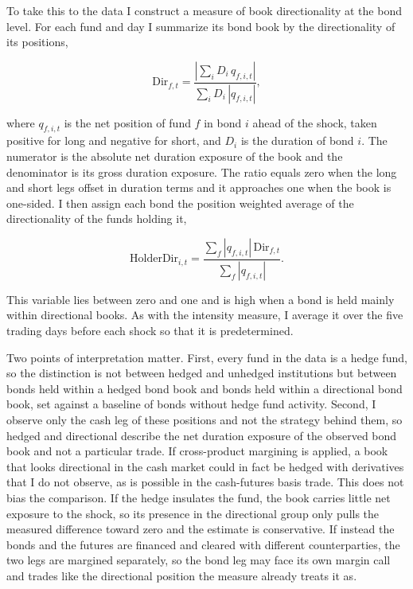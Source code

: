 \documentclass[english, 11pt, oneside]{article}
\begin{document}
To take this to the data I construct a measure of book directionality at the bond level. For each fund and day I summarize its bond book by the directionality of its positions,

\begin{equation}
\text{Dir}_{f,t} = \frac{\left| \sum_{i} D_{i}\, q_{f,i,t} \right|}{\sum_{i} D_{i}\, \left| q_{f,i,t} \right|} ,
\end{equation}

\noindent where $q_{f,i,t}$ is the net position of fund $f$ in bond $i$ ahead of the shock, taken positive for long and negative for short, and $D_{i}$ is the duration of bond $i$. The numerator is the absolute net duration exposure of the book and the denominator is its gross duration exposure. The ratio equals zero when the long and short legs offset in duration terms and it approaches one when the book is one-sided. I then assign each bond the position weighted average of the directionality of the funds holding it,

\begin{equation}
\text{HolderDir}_{i,t} = \frac{\sum_{f} \left| q_{f,i,t} \right|\, \text{Dir}_{f,t}}{\sum_{f} \left| q_{f,i,t} \right|} .
\end{equation}

\noindent This variable lies between zero and one and is high when a bond is held mainly within directional books. As with the intensity measure, I average it over the five trading days before each shock so that it is predetermined.

Two points of interpretation matter. First, every fund in the data is a hedge fund, so the distinction is not between hedged and unhedged institutions but between bonds held within a hedged bond book and bonds held within a directional bond book, set against a baseline of bonds without hedge fund activity. Second, I observe only the cash leg of these positions and not the strategy behind them, so hedged and directional describe the net duration exposure of the observed bond book and not a particular trade. If cross-product margining is applied, a book that looks directional in the cash market could in fact be hedged with derivatives that I do not observe, as is possible in the cash-futures basis trade. This does not bias the comparison. If the hedge insulates the fund, the book carries little net exposure to the shock, so its presence in the directional group only pulls the measured difference toward zero and the estimate is conservative. If instead the bonds and the futures are financed and cleared with different counterparties, the two legs are margined separately, so the bond leg may face its own margin call and trades like the directional position the measure already treats it as.
\end{document}
